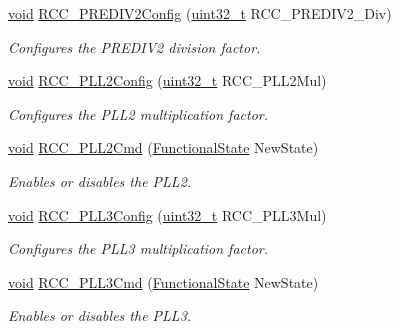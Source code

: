 \begin{DoxyCompactItemize}
\hyperlink{group___n_a_m_e_ga18028b8badbf1ea7e704ccac3c488e82}{void} \hyperlink{group___r_c_c___exported___functions_ga27a27bc6c9905f7b5da714498d2acd25}{R\-C\-C\-\_\-\-P\-R\-E\-D\-I\-V2\-Config} (\hyperlink{stdint_8h_a435d1572bf3f880d55459d9805097f62}{uint32\-\_\-t} R\-C\-C\-\_\-\-P\-R\-E\-D\-I\-V2\-\_\-\-Div)
\begin{DoxyCompactList}\small\item\em Configures the P\-R\-E\-D\-I\-V2 division factor. \end{DoxyCompactList}\item 
\hyperlink{group___n_a_m_e_ga18028b8badbf1ea7e704ccac3c488e82}{void} \hyperlink{group___r_c_c___exported___functions_ga1cae2b5d86fcc31f8ed6ee7ff258fa0c}{R\-C\-C\-\_\-\-P\-L\-L2\-Config} (\hyperlink{stdint_8h_a435d1572bf3f880d55459d9805097f62}{uint32\-\_\-t} R\-C\-C\-\_\-\-P\-L\-L2\-Mul)
\begin{DoxyCompactList}\small\item\em Configures the P\-L\-L2 multiplication factor. \end{DoxyCompactList}\item 
\hyperlink{group___n_a_m_e_ga18028b8badbf1ea7e704ccac3c488e82}{void} \hyperlink{group___r_c_c___exported___functions_gae5122c6528f9e1f87b6bc63e15f1b4f7}{R\-C\-C\-\_\-\-P\-L\-L2\-Cmd} (\hyperlink{group___exported__types_gac9a7e9a35d2513ec15c3b537aaa4fba1}{Functional\-State} New\-State)
\begin{DoxyCompactList}\small\item\em Enables or disables the P\-L\-L2. \end{DoxyCompactList}\item 
\hyperlink{group___n_a_m_e_ga18028b8badbf1ea7e704ccac3c488e82}{void} \hyperlink{group___r_c_c___exported___functions_gaf9d903f46328af5cbe765aa1d27411ac}{R\-C\-C\-\_\-\-P\-L\-L3\-Config} (\hyperlink{stdint_8h_a435d1572bf3f880d55459d9805097f62}{uint32\-\_\-t} R\-C\-C\-\_\-\-P\-L\-L3\-Mul)
\begin{DoxyCompactList}\small\item\em Configures the P\-L\-L3 multiplication factor. \end{DoxyCompactList}\item 
\hyperlink{group___n_a_m_e_ga18028b8badbf1ea7e704ccac3c488e82}{void} \hyperlink{group___r_c_c___exported___functions_gabe429b627f961fa716609a90e4520402}{R\-C\-C\-\_\-\-P\-L\-L3\-Cmd} (\hyperlink{group___exported__types_gac9a7e9a35d2513ec15c3b537aaa4fba1}{Functional\-State} New\-State)
\begin{DoxyCompactList}\small\item\em Enables or disables the P\-L\-L3. \end{DoxyCompactList}\item 

\end{DoxyCompactItemize}
